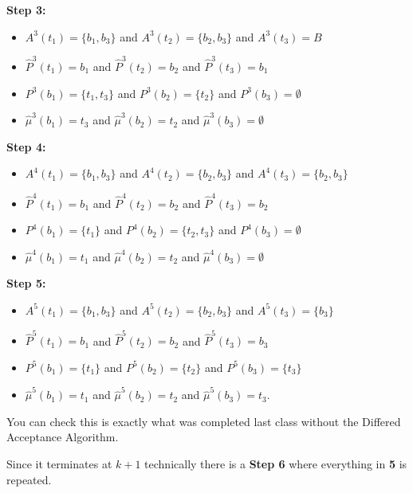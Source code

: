 \documentclass[11pt]{article}
\providecommand{\tightlist}{%
      \setlength{\itemsep}{0pt}\setlength{\parskip}{0pt}}
\begin{document}
\textbf{Step 3:}

\begin{itemize}
\tightlist
\item
  \(A^3(t_1) = \{b_1, b_3\}\) and \(A^3(t_2) = \{b_2, b_3\}\) and
  \(A^3(t_3) = B\)
\item
  \(\hat{P}^3(t_1) = b_1\) and \(\hat{P}^3(t_2) = b_2\) and
  \(\hat{P}^3(t_3) = b_1\)
\item
  \(P^3(b_1) = \{t_1, t_3\}\) and \(P^3(b_2) = \{t_2\}\) and
  \(P^3(b_3) = \emptyset\)
\item
  \(\hat{\mu}^3(b_1) = t_3\) and \(\hat{\mu}^3(b_2) = t_2\) and
  \(\hat{\mu}^3(b_3) = \emptyset\)
\end{itemize}

\textbf{Step 4:}

\begin{itemize}
\tightlist
\item
  \(A^4(t_1) = \{b_1, b_3\}\) and \(A^4(t_2) = \{b_2, b_3\}\) and
  \(A^4(t_3) = \{b_2, b_3\}\)
\item
  \(\hat{P}^4(t_1) = b_1\) and \(\hat{P}^4(t_2) = b_2\) and
  \(\hat{P}^4(t_3) = b_2\)
\item
  \(P^4(b_1) = \{t_1\}\) and \(P^4(b_2) = \{t_2, t_3\}\) and
  \(P^4(b_3) = \emptyset\)
\item
  \(\hat{\mu}^4(b_1) = t_1\) and \(\hat{\mu}^4(b_2) = t_2\) and
  \(\hat{\mu}^4(b_3) = \emptyset\)
\end{itemize}

\textbf{Step 5:}

\begin{itemize}
\tightlist
\item
  \(A^5(t_1) = \{b_1, b_3\}\) and \(A^5(t_2) = \{b_2, b_3\}\) and
  \(A^5(t_3) = \{b_3\}\)
\item
  \(\hat{P}^5(t_1) = b_1\) and \(\hat{P}^5(t_2) = b_2\) and
  \(\hat{P}^5(t_3) = b_3\)
\item
  \(P^5(b_1) = \{t_1\}\) and \(P^5(b_2) = \{t_2\}\) and
  \(P^5(b_3) = \{t_3\}\)
\item
  \(\hat{\mu}^5(b_1) = t_1\) and \(\hat{\mu}^5(b_2) = t_2\) and
  \(\hat{\mu}^5(b_3) = t_3\).
\end{itemize}

You can check this is exactly what was completed last class without the
Differed Acceptance Algorithm.

Since it terminates at \(k+1\) technically there is a \textbf{Step 6}
where everything in \textbf{5} is repeated.


    
    
    
    
\end{document}
